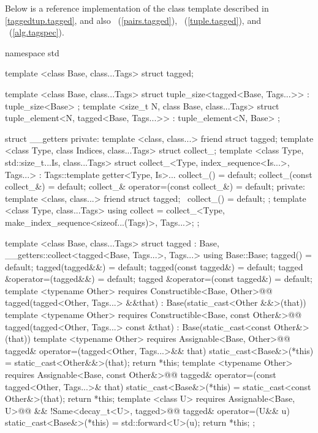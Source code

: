 
\pnum Below is a reference implementation of the  class template described in
\ref{taggedtup.tagged}, and also ~(\ref{pairs.tagged}),
~(\ref{tuple.tagged}), and ~(\ref{alg.tagspec}).

\begin{codeblock}
namespace std {
  template <class Base, class...Tags>
  struct tagged;

  template <class Base, class...Tags>
  struct tuple_size<tagged<Base, Tags...>>
    : tuple_size<Base> { };
  template <size_t N, class Base, class...Tags>
  struct tuple_element<N, tagged<Base, Tags...>>
    : tuple_element<N, Base> { };

  struct __getters {
  private:
    template <class, class...> friend struct tagged;
    template <class Type, class Indices, class...Tags>
    struct collect_;
    template <class Type, std::size_t...Is, class...Tags>
    struct collect_<Type, index_sequence<Is...>, Tags...>
      : Tags::template getter<Type, Is>... {
      collect_() = default;
      collect_(const collect_&) = default;
      collect_& operator=(const collect_&) = default;
    private:
      template <class, class...> friend struct tagged;
      ~collect_() = default;
    };
    template <class Type, class...Tags>
    using collect = collect_<Type, make_index_sequence<sizeof...(Tags)>, Tags...>;
  };

  template <class Base, class...Tags>
  struct tagged
    : Base, __getters::collect<tagged<Base, Tags...>, Tags...> {
    using Base::Base;
    tagged() = default;
    tagged(tagged&&) = default;
    tagged(const tagged&) = default;
    tagged &operator=(tagged&&) = default;
    tagged &operator=(const tagged&) = default;
    template <typename Other>
      requires Constructible<Base, Other>@\newtxt{()}@
    tagged(tagged<Other, Tags...> &&that)
      : Base(static_cast<Other &&>(that)) { }
    template <typename Other>
      requires Constructible<Base, const Other&>@\newtxt{()}@
    tagged(tagged<Other, Tags...> const &that)
      : Base(static_cast<const Other&>(that)) { }
    template <typename Other>
      requires Assignable<Base, Other>@\newtxt{()}@
    tagged& operator=(tagged<Other, Tags...>&& that) {
      static_cast<Base&>(*this) = static_cast<Other&&>(that);
      return *this;
    }
    template <typename Other>
      requires Assignable<Base, const Other&>@\newtxt{()}@
    tagged& operator=(const tagged<Other, Tags...>& that) {
      static_cast<Base&>(*this) = static_cast<const Other&>(that);
      return *this;
    }
    template <class U>
      requires Assignable<Base, U>@\newtxt{()}@ && !Same<decay_t<U>, tagged>@\newtxt{()}@
    tagged& operator=(U&& u) {
      static_cast<Base&>(*this) = std::forward<U>(u);
      return *this;
    }
  };

}
\end{codeblock}
